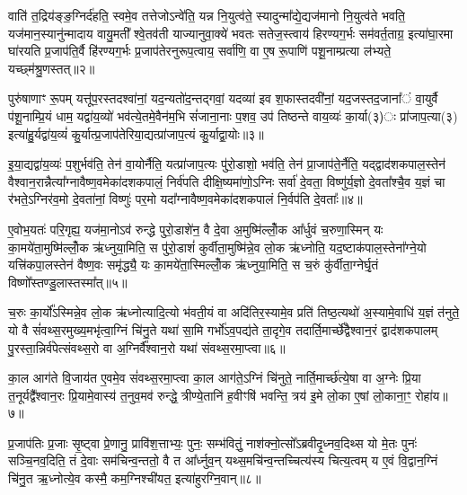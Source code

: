 वाति॑ त॒द्रिय॑ङ्ङ॒ग्निर्द॑हति॒ स्वमे॒व तत्तेजो\-ऽन्वे॑ति॒ यन्न नि॒युत्व॑ते॒ स्यादुन्मा᳚द्ये॒द्यज॑मानो नि॒युत्व॑ते भवति॒ यज॑मान॒स्यानु॑न्मादाय वायु॒मती᳚ श्वे॒तव॑ती याज्यानुवा॒क्ये॑ भवतः सतेज॒स्त्वाय॑ हिरण्यग॒र्भः सम॑वर्त॒ताग्र॒ इत्या॑घा॒रमा घा॑रयति प्र॒जाप॑ति॒र्वै हि॑रण्यग॒र्भः प्र॒जाप॑तेरनुरूप॒त्वाय॒ सर्वा॑णि॒ वा ए॒ष रू॒पाणि॑ पशू॒नाम्प्रत्या ल॑भ्यते॒ यच्छ्म॑श्रु॒णस्तत्॥२॥

पुरु॑षाणाꣳ रू॒पम् यत्तू॑प॒रस्तदश्वा॑नां॒ यद॒न्यतो॑द॒न्तद्गवां॒ यदव्या॑ इव श॒फास्तदवी॑नां॒ यद॒जस्तद॒जाना᳚ं वा॒युर्वै प॑शू॒नाम्प्रि॒यं धाम॒ यद्वा॑य॒व्यो॑ भव॑त्ये॒तमे॒वैन॑म॒भि सं॑जाना॒नाः प॒शव॒ उप॑ तिष्ठन्ते वाय॒व्यः॑ का॒र्या(३)ः प्रा॑जाप॒त्या(३) इत्या॑हु॒र्यद्वा॑य॒व्यं॑ कु॒र्यात्प्र॒जाप॑तेरिया॒द्यत्प्रा॑जाप॒त्यं कु॒र्याद्वा॒योः॥३॥

इ॒या॒द्यद्वा॑य॒व्यः॑ प॒शुर्भव॑ति॒ तेन॑ वा॒योर्नैति॒ यत्प्रा॑जाप॒त्यः पु॑रो॒डाशो॒ भव॑ति॒ तेन॑ प्रा॒जाप॑ते॒र्नैति॒ यद्द्वाद॑शकपाल॒स्तेन॑ वैश्वान॒रान्नैत्या᳚ग्नावैष्ण॒वमेका॑दशकपालं॒ निर्व॑पति दीक्षि॒ष्यमा॑णो॒\-ऽग्निः सर्वा॑ दे॒वता॒ विष्णु॑र्य॒ज्ञो दे॒वता᳚श्चै॒व य॒ज्ञं चा र॑भते॒\-ऽग्निर॑व॒मो दे॒वता॑नां॒ विष्णुः॑ पर॒मो यदा᳚ग्नावैष्ण॒वमेका॑दशकपालं नि॒र्वप॑ति दे॒वताः᳚॥४॥

ए॒वोभ॒यतः॑ परि॒गृह्य॒ यज॑मा॒नो\-ऽव॑ रुन्द्धे पुरो॒डाशे॑न॒ वै दे॒वा अ॒मुष्मि॑ल्लोँ॒क आ᳚र्धुवं च॒रुणा॒स्मिन् यः का॒मये॑ता॒मुष्मि॑ल्लोँ॒क ऋ॑ध्नुया॒मिति॒ स पु॑रो॒डाशं॑ कुर्वीता॒मुष्मि॑न्ने॒व लो॒क ऋ॑ध्नोति॒ यद॒ष्टाक॑पाल॒स्तेना᳚ग्ने॒यो यत्त्रि॑कपा॒लस्तेन॑ वैष्ण॒वः समृ॑द्ध्यै॒ यः का॒मये॑ता॒स्मिल्लोँ॒क ऋ॑ध्नुया॒मिति॒ स च॒रुं कु॑र्वीता॒ग्नेर्घृ॒तं विष्णो᳚स्तण्डु॒लास्तस्मा᳚त्॥५॥

च॒रुः का॒र्यो᳚\-ऽस्मिन्ने॒व लो॒क ऋ॑ध्नोत्यादि॒त्यो भ॑वती॒यं वा अदि॑तिर॒स्यामे॒व प्रति॑ तिष्ठ॒त्यथो॑ अ॒स्यामे॒वाधि॑ य॒ज्ञं त॑नुते॒ यो वै सं॑वथ्स॒रमुख्य॒मभृ॑त्वा॒ग्निं चि॑नु॒ते यथा॑ सा॒मि गर्भो॑\-ऽव॒पद्य॑ते ता॒दृगे॒व तदार्ति॒मार्च्छे᳚द्वैश्वान॒रं द्वाद॑शकपालम् पु॒रस्ता॒न्निर्व॑पेत्संवथ्स॒रो वा अ॒ग्निर्वै᳚श्वान॒रो यथा॑ संवथ्स॒रमा॒प्त्वा॥६॥

का॒ल आग॑ते वि॒जाय॑त ए॒वमे॒व सं॑वथ्स॒रमा॒प्त्वा का॒ल आग॑ते॒\-ऽग्निं चि॑नुते॒ नार्ति॒मार्च्छ॑त्ये॒षा वा अ॒ग्नेः प्रि॒या त॒नूर्यद्वै᳚श्वान॒रः प्रि॒यामे॒वास्य॑ त॒नुव॒मव॑ रुन्द्धे॒ त्रीण्ये॒तानि॑ ह॒वीꣳषि॑ भवन्ति॒ त्रय॑ इ॒मे लो॒का ए॒षां लो॒काना॒ꣳ॒ रोहा॑य॥७॥

{\anuvakamend[{य॒द्रिय॑ङ्वा॒युर्यच्छ्म॑श्रु॒णस्तद्वा॒योर्नि॒र्वप॑ति दे॒वता॒स्तस्मा॑दा॒प्त्वाष्टात्रिꣳ॑शच्च॥१॥}]}

प्र॒जाप॑तिः प्र॒जाः सृ॒ष्ट्वा प्रे॒णानु॒ प्रावि॑श॒त्ताभ्यः॒ पुनः॒ सम्भ॑वितुं॒ नाश॑क्नो॒त्सो᳚\-ऽब्रवीदृ॒ध्नव॒दिथ्स यो मे॒तः पुनः॑ सञ्चि॒नव॒दिति॒ तं दे॒वाः सम॑चिन्व॒न्ततो॒ वै त आ᳚र्ध्नुव॒न् यथ्स॒मचि॑न्व॒न्तच्चित्य॑स्य चित्य॒त्वम् य ए॒वं वि॒द्वान॒ग्निं चि॑नु॒त ऋ॒ध्नोत्ये॒व कस्मै॒ कम॒ग्निश्ची॑यत॒ इत्या॑हुरग्नि॒वान्॥८॥

